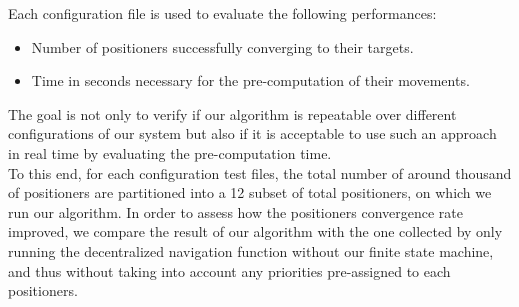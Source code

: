 \documentclass[]{spie}  %
\begin{document}
	Each configuration file is used to evaluate the following performances: 
	\begin{itemize}
		\item Number of positioners successfully converging to their targets.
		\item Time in seconds necessary for the pre-computation of their movements.
	\end{itemize}
	The goal is not only to verify if our algorithm is repeatable over different configurations of our system but also if it is acceptable to use such an approach in real time by evaluating the pre-computation time.\\
	To this end, for each configuration test files, the total number of around thousand of positioners are partitioned into a 12 subset of total positioners, on which we run our algorithm.
	In order to assess how the positioners convergence rate improved, we compare the result of our algorithm with the one collected by only running the decentralized navigation function without our finite state machine, and thus without taking into account any priorities pre-assigned to each positioners.
\end{document}
